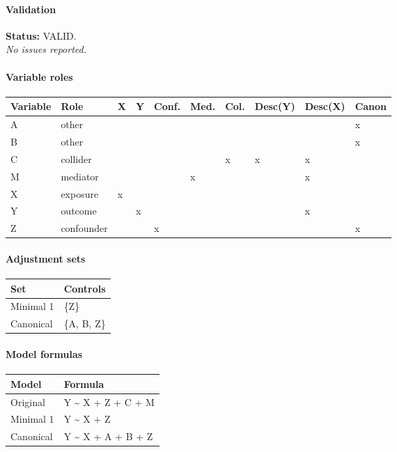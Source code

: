 \begingroup\small
\paragraph{Validation}
\textbf{Status:} VALID.
\\[2pt]\textit{No issues reported.}

\paragraph{Variable roles}
\begin{center}
\setlength{\LTleft}{0pt}\setlength{\LTright}{0pt}
\begin{longtable}{@{ }l l l l l l l l l l@{ }}
\toprule
Variable & Role & X & Y & Conf. & Med. & Col. & Desc(Y) & Desc(X) & Canon \\
\midrule
A & other &  &  &  &  &  &  &  & x \\
B & other &  &  &  &  &  &  &  & x \\
C & collider &  &  &  &  & x & x & x &  \\
M & mediator &  &  &  & x &  &  & x &  \\
X & exposure & x &  &  &  &  &  &  &  \\
Y & outcome &  & x &  &  &  &  & x &  \\
Z & confounder &  &  & x &  &  &  &  & x \\
\bottomrule
\end{longtable}
\end{center}

\paragraph{Adjustment sets}
\begin{center}
\setlength{\LTleft}{0pt}\setlength{\LTright}{0pt}
\begin{longtable}{@{ }l l@{ }}
\toprule
Set & Controls \\
\midrule
Minimal 1 & \{Z\} \\
Canonical & \{A, B, Z\} \\
\bottomrule
\end{longtable}
\end{center}

\paragraph{Model formulas}
\begin{center}
\setlength{\LTleft}{0pt}\setlength{\LTright}{0pt}
\begin{longtable}{@{ }l p{}@{ }}
\toprule
Model & Formula \\
\midrule
Original & Y \textasciitilde{} X + Z + C + M \\
Minimal 1 & Y \textasciitilde{} X + Z \\
Canonical & Y \textasciitilde{} X + A + B + Z \\
\bottomrule
\end{longtable}
\end{center}

